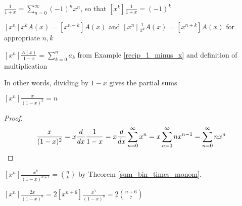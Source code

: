 \documentclass[a4paper]{article}
\begin{document}
\begin{example}
$\displaystyle\frac1{1+x}=\sum_{n=0}^\infty (-1)^nx^n$, so that $\displaystyle[x^k]\frac1{1+x}=(-1)^k$
\end{example}

\begin{example}
$[x^n]x^kA(x)=[x^{n-k}]A(x)$ and $\displaystyle[x^n]\frac1{x^k}A(x)=[x^{n+k}]A(x)$ for appropriate $n,k$
\end{example}

\begin{example}
$\displaystyle[x^n]\frac{A(x)}{1-x}=\sum_{k=0}^na_k$ from Example \ref{recip_1_minus_x} and definition of multiplication
\begin{arrows}
\item In other words, dividing by $1-x$ gives the partial sums
\end{arrows}
\end{example}

\begin{example}
$\displaystyle[x^n]\frac x{(1-x)^2}=n$

\begin{hl}
\begin{proof}
\begin{equation*}
\frac x{(1-x)^2}
=x\frac d{dx}\frac1{1-x}
=x\frac d{dx}\sum_{n=0}^\infty x^n
=x\sum_{n=0}^\infty nx^{n-1}
=\sum_{n=0}^\infty nx^n\qedhere
\end{equation*}
\end{proof}
\end{hl}
\end{example}

\begin{example}
$\displaystyle[x^n]\frac{x^k}{(1-x)^{k+1}}=\binom nk$ by Theorem \ref{sum_bin_times_monom}.
\end{example}

\begin{example}
$\displaystyle[x^n]\frac{2x}{(1-x)^8}=2[x^{n+6}]\frac{x^7}{(1-x)^8}=2\binom{n+6}7$
\end{example}
\end{document}
